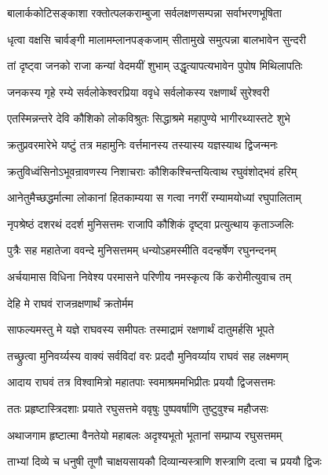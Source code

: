 \twolineshloka
{बालार्ककोटिसङ्काशा रक्तोत्पलकराम्बुजा}
{सर्वलक्षणसम्पन्ना सर्वाभरणभूषिता}%

\twolineshloka
{धृत्वा वक्षसि चार्वङ्गी मालामम्लानपङ्कजाम्}
{सीतामुखे समुत्पन्ना बालभावेन सुन्दरी}%

\twolineshloka
{तां दृष्ट्वा जनको राजा कन्यां वेदमयीं शुभाम्}
{उद्धृत्यापत्यभावेन पुपोष मिथिलापतिः}%

\twolineshloka
{जनकस्य गृहे रम्ये सर्वलोकेश्वरप्रिया}
{ववृधे सर्वलोकस्य रक्षणार्थं सुरेश्वरी}%

\twolineshloka
{एतस्मिन्नन्तरे देवि कौशिको लोकविश्रुतः}
{सिद्धाश्रमे महापुण्ये भागीरथ्यास्तटे शुभे}%

\twolineshloka
{क्रतुप्रवरमारेभे यष्टुं तत्र महामुनिः}
{वर्त्तमानस्य तस्यास्य यज्ञस्याथ द्विजन्मनः}%

\twolineshloka
{क्रतुविध्वंसिनोऽभूवन्रावणस्य निशाचराः}
{कौशिकश्चिन्तयित्वाथ रघुवंशोद्भवं हरिम्}%

\twolineshloka
{आनेतुमैच्छद्धर्मात्मा लोकानां हितकाम्यया}
{स गत्वा नगरीं रम्यामयोध्यां रघुपालिताम्}%

\twolineshloka
{नृपश्रेष्ठं दशरथं ददर्श मुनिसत्तमः}
{राजापि कौशिकं दृष्ट्वा प्रत्युत्थाय कृताञ्जलिः}%

\twolineshloka
{पुत्रैः सह महातेजा ववन्दे मुनिसत्तमम्}
{धन्योऽहमस्मीति वदन्हर्षेण रघुनन्दनम्}%

\twolineshloka
{अर्चयामास विधिना निवेश्य परमासने}
{परिणीय नमस्कृत्य किं करोमीत्युवाच तम्}%


\onelineshloka
{देहि मे राघवं राजन्रक्षणार्थं क्रतोर्मम}%

\twolineshloka
{साफल्यमस्तु मे यज्ञे राघवस्य समीपतः}
{तस्माद्रामं रक्षणार्थं दातुमर्हसि भूपते}%


\twolineshloka
{तच्छ्रुत्वा मुनिवर्य्यस्य वाक्यं सर्वविदां वरः}
{प्रददौ मुनिवर्य्याय राघवं सह लक्ष्मणम्}%

\twolineshloka
{आदाय राघवं तत्र विश्वामित्रो महातपाः}
{स्वमाश्रममभिप्रीतः प्रययौ द्विजसत्तमः}%

\twolineshloka
{ततः प्रहृष्टास्त्रिदशाः प्रयाते रघुसत्तमे}
{ववृषुः पुष्पवर्षाणि तुष्टुवुश्च महौजसः}%

\twolineshloka
{अथाजगाम हृष्टात्मा वैनतेयो महाबलः}
{अदृश्यभूतो भूतानां सम्प्राप्य रघुसत्तमम्}%

\twolineshloka
{ताभ्यां दिव्ये च धनुषी तूणौ चाक्षयसायकौ}
{दिव्यान्यस्त्राणि शस्त्राणि दत्वा च प्रययौ द्विजः}%

